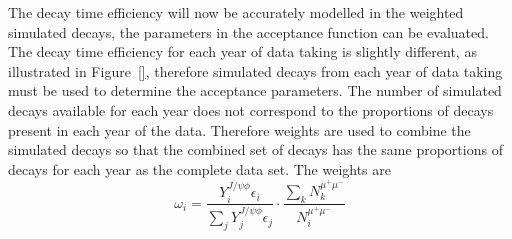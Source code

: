 
The decay time efficiency will now be accurately modelled in the weighted simulated \bsmumu decays, the parameters in the acceptance function can be evaluated. The decay time efficiency for each year of data taking is slightly different, as illustrated in Figure~\ref{}, therefore simulated decays from each year of data taking must be used to determine the acceptance parameters. The number of simulated decays available for each year does not correspond to the proportions of decays present in each year of the data. Therefore weights are used to combine the simulated decays so that the combined set of decays has the same proportions of decays for each year as the complete data set. The weights are
\begin{equation}
\omega_{i}  = \frac{Y_{i}^{J/\psi \phi} \epsilon_{i}}{\displaystyle\sum_{j} Y_{j}^{J/\psi \phi} \epsilon_{j}} \cdot \frac{\displaystyle\sum_{k} N_{k}^{\mu^{+}\mu^{-}}}{N_{i}^{\mu^{+}\mu^{-}}}
\end{equation}
